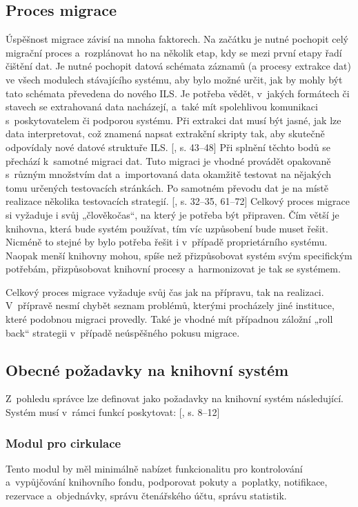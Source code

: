 \documentclass[
	11pt, oneside, printed, final, palatino
	microtype,
	table,   %
	lof,     %
	lot     %
]{fithesis3}
\newcommand{\citepages}[2]{[\cite{#2}, s. #1]}
\begin{document}
{\subsection{Proces migrace}
Úspěšnost migrace závisí na mnoha faktorech. Na začátku je nutné pochopit celý migrační proces a~rozplánovat ho na několik etap, kdy se mezi první etapy řadí čištění dat. Je nutné pochopit datová schémata záznamů (a procesy extrakce dat) ve všech modulech stávajícího systému, aby bylo možné určit, jak by mohly být tato schémata převedena do nového ILS. Je potřeba vědět, v~jakých formátech či stavech se extrahovaná data nacházejí, a~také mít spolehlivou komunikaci s~poskytovatelem či podporou systému. Při extrakci dat musí být jasné, jak lze data interpretovat, což znamená napsat extrakční skripty tak, aby skutečně odpovídaly nové datové struktuře ILS. \citepages{43–48}{krbiwFHfrnvG2ZXf} Při splnění těchto bodů se přechází k~samotné migraci dat. Tuto migraci je vhodné provádět opakovaně s~různým množstvím dat a~importovaná data okamžitě testovat na nějakých tomu určených testovacích stránkách. Po samotném převodu dat je na místě realizace několika testovacích strategií. \citepages{32–35, 61–72}{Denar2015thesis} Celkový proces migrace si vyžaduje i svůj „člověkočas“, na který je potřeba být připraven. Čím větší je knihovna, která bude systém používat, tím víc uzpůsobení bude muset řešit. Nicméně to stejné by bylo potřeba řešit i v~případě proprietárního systému. Naopak menší knihovny mohou, spíše než přizpůsobovat systém svým specifickým potřebám, přizpůsobovat knihovní procesy a~harmonizovat je tak se systémem.

Celkový proces migrace vyžaduje svůj čas jak na přípravu, tak na realizaci. V~přípravě nesmí chybět seznam problémů, kterými procházely jiné instituce, které podobnou migraci provedly. Také je vhodné mít případnou záložní „roll back“ strategii v~případě neúspěšného pokusu migrace.

\subsection{Obecné požadavky na knihovní systém} \label{sec:obecne_pozadavky_na_knihovni_system}
Z~pohledu správce lze definovat jako požadavky na knihovní systém následující.
Systém musí v~rámci funkcí poskytovat: \citepages{8–12}{bilal_2014}

\subsubsection{{\large Modul pro cirkulace}}
Tento modul by měl minimálně nabízet funkcionalitu pro kontrolování a~vypůjčování knihovního fondu, podporovat pokuty a~poplatky, notifikace, rezervace a~objednávky, správu čtenářského účtu, správu statistik.

}
\end{document}
